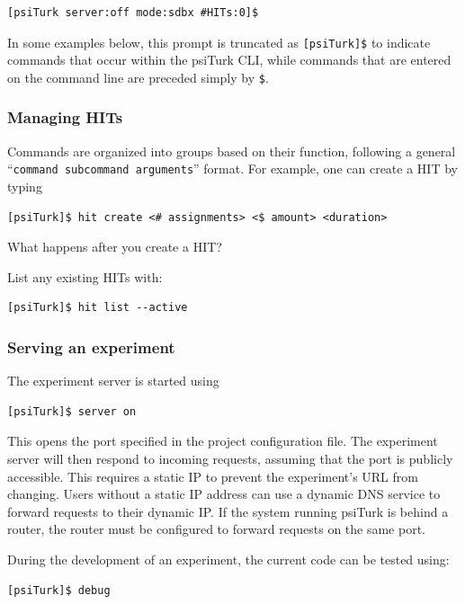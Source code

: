 \documentclass[twocolumn]{svjour3}          %
\begin{document}
\begin{lstlisting}
[psiTurk server:off mode:sdbx #HITs:0]$
\end{lstlisting}

\noindent In some examples below, this prompt is truncated as \texttt{[psiTurk]\$} to indicate commands that occur within the psiTurk CLI, while commands that are entered on the command line are preceded simply by \texttt{\$}.


\subsubsection{Managing HITs}
Commands are organized into groups based on their function, following a general ``\texttt{command subcommand
arguments}'' format. For example, one can create a HIT by typing 

\begin{lstlisting}
[psiTurk]$ hit create <# assignments> <$ amount> <duration>
\end{lstlisting}

What happens after you create a HIT?

List any existing HITs with:

\begin{lstlisting}
[psiTurk]$ hit list --active
\end{lstlisting}


\subsubsection{Serving an experiment}

The experiment server is started using

\begin{lstlisting}
[psiTurk]$ server on
\end{lstlisting}

\noindent This opens the port specified in the project configuration file.
The experiment server will then respond to incoming requests, assuming that the port is publicly accessible.
This requires a static IP to prevent the experiment's URL from changing.
Users without a static IP address can use a dynamic DNS service to forward requests to their dynamic IP.
If the system running psiTurk is behind a router, the router must be configured to forward requests on the same port.

During the development of an experiment, the current code can be tested using:

\begin{lstlisting}
[psiTurk]$ debug
\end{lstlisting}
\end{document}

